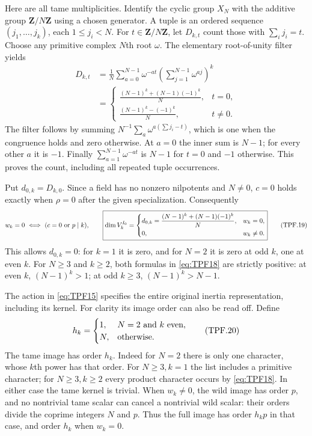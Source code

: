 Here are all tame multiplicities. Identify the cyclic
group \(X_N\) with the additive group \(\mathbf Z/N\mathbf Z\)
using a chosen generator. A tuple is an ordered sequence
\((j_1,\ldots,j_k)\), each \(1\le j_i<N\).
For \(t\in\mathbf Z/N\mathbf Z\), let \(D_{k,t}\) count
those with \(\sum_i j_i=t\). Choose any primitive complex
\(N\)th root \(\omega\). The elementary root-of-unity
filter yields
\[
 \begin{split}
 D_{k,t}
 &=\frac1N\sum_{a=0}^{N-1}\omega^{-at}
                  \left(\sum_{j=1}^{N-1}\omega^{aj}\right)^k\\
 &=\begin{cases}
 \displaystyle\frac{(N-1)^k+(N-1)(-1)^k}{N},&t=0,\\[4pt]
 \displaystyle\frac{(N-1)^k-(-1)^k}{N},&t\ne0 .
 \end{cases}
 \end{split}
 \tag{TPF.18}\label{eq:TPF18}
\]
The filter follows by summing
\(N^{-1}\sum_a\omega^{a(\sum j_i-t)}\), which is one
when the congruence holds and zero otherwise.
At \(a=0\) the inner sum is \(N-1\); for every other
\(a\) it is \(-1\). Finally
\(\sum_{a=1}^{N-1}\omega^{-at}\) is \(N-1\) for \(t=0\)
and \(-1\) otherwise. This proves the count, including
all repeated tuple occurrences.

Put \(d_{0,k}=D_{k,0}\). Since a field has no nonzero
nilpotents and \(N\ne0\), \(c=0\) holds exactly when
\(\rho=0\) after the given specialization. Consequently
\[
 w_k=0\ \Longleftrightarrow\ (c=0\ \hbox{or}\ p\mid k),
 \qquad
 \boxed{\displaystyle
 \dim V_k^{I_0}=
 \begin{cases}
 d_{0,k}=\dfrac{(N-1)^k+(N-1)(-1)^k}{N},&w_k=0,\\[5pt]
 0,&w_k\ne0 .
 \end{cases}}
 \tag{TPF.19}\label{eq:TPF19}
\]
This allows \(d_{0,k}=0\): for \(k=1\) it is zero,
and for \(N=2\) it is zero at odd \(k\), one at even
\(k\). For \(N\ge3\) and \(k\ge2\), both formulas
in \eqref{eq:TPF18} are strictly positive: at even
\(k\), \((N-1)^k>1\); at odd \(k\ge3\),
\((N-1)^k>N-1\).

The action in \eqref{eq:TPF15} specifies the entire
original inertia representation, including its kernel.
For clarity its image order can also be read off.
Define
\[
 h_k=\begin{cases}1,&N=2\ \hbox{and }k\ \hbox{even},\\
                  N,&\hbox{otherwise}.
       \end{cases}
 \tag{TPF.20}\label{eq:TPF20}
\]
The tame image has order \(h_k\). Indeed for \(N=2\)
there is only one character, whose \(k\)th power has
that order. For \(N\ge3,k=1\) the list includes a
primitive character; for \(N\ge3,k\ge2\) every product
character occurs by \eqref{eq:TPF18}. In either case
the tame kernel is trivial. When \(w_k\ne0\), the wild
image has order \(p\), and no nontrivial tame scalar
can cancel a nontrivial wild scalar: their orders
divide the coprime integers \(N\) and \(p\).
Thus the full image has order \(h_kp\) in that case,
and order \(h_k\) when \(w_k=0\).

